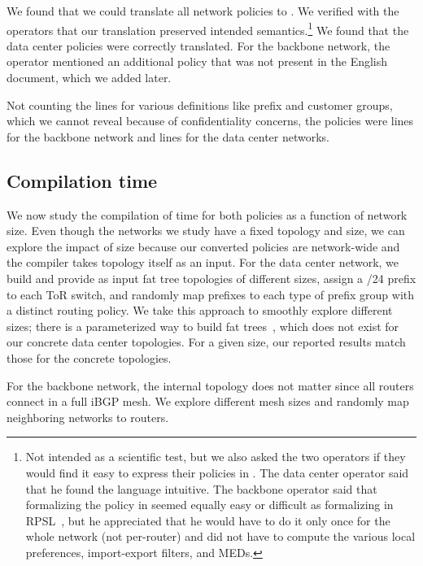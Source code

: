 We found that we could translate all network policies to \sysname. We verified with the operators that our translation preserved intended semantics.\footnote{Not intended as a scientific test, but we also asked the two operators if they would find it easy to express their policies in \sysname. The data center operator said that he found the language intuitive. The backbone operator said that formalizing the policy in \sysname seemed equally easy or difficult as formalizing in RPSL~\cite{x}, but he appreciated that he would have to do it only once for the whole network (not per-router) and did not have to compute the various local preferences, import-export filters, and MEDs.} We found that the data center policies were correctly translated. For the backbone network, the operator mentioned an additional policy that was not present in the English document, which we added later.

Not counting the lines for various definitions like prefix and customer groups, which we cannot reveal because of confidentiality concerns, the \sysname policies were  lines for the backbone network and  lines for the data center networks.

\subsection{Compilation time}

We now study the compilation of time for both policies as a function of network size. Even though the networks we study have a fixed topology and size, we can explore the impact of size because our converted policies are network-wide and the compiler takes topology itself as an input. For the data center network, we build and provide as input fat tree topologies of different sizes, assign a /24 prefix to each ToR switch, and randomly map prefixes to each type of prefix group with a distinct routing policy. We take this approach to smoothly explore different sizes; there is a parameterized way to build fat trees~\cite{fattree}, which does not exist for our concrete data center topologies. For a given size, our reported results match those for the concrete topologies.

For the backbone network, the internal topology does not matter since all routers connect in a full iBGP mesh. We explore different mesh sizes and randomly map neighboring networks to routers.


